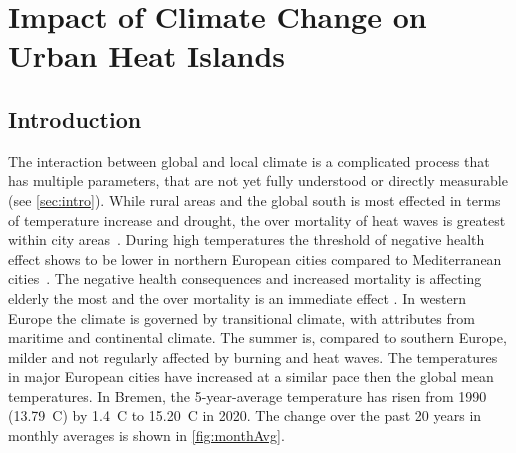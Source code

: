 \documentclass[12pt,a4paper, english,twoside]{scrartcl}
\begin{document}
  \newpage
  \section{Impact of Climate Change on Urban Heat Islands}\label{sec:UHITempImp}
    \subsection{Introduction}
      The interaction between global and local climate is a complicated process that has multiple parameters, that are not yet fully understood or directly measurable (see \cref{sec:intro}).  
      While rural areas and the global south is most effected in terms of temperature increase and drought, the over mortality of heat waves is greatest within city areas~\autocite{Gabriel2011}. During high temperatures the threshold of negative health effect shows to be lower in northern European cities compared to Mediterranean cities~\autocite{Baccini2008}. 
      The negative health consequences and increased mortality is affecting elderly the most and the over mortality is an immediate effect \autocite{Baccini2008}. 
      In western Europe the climate is governed by transitional climate, with attributes from maritime and continental climate.
      The summer is, compared to southern Europe, milder and not regularly affected by burning and heat waves. 
      The temperatures in major European cities have increased at a similar pace then the global mean temperatures. 
      In Bremen, the 5-year-average temperature has risen from 1990 (13.79\textdegree\ C)  by 1.4\textdegree\ C to 15.20\textdegree\ C in 2020.
      The change over the past 20 years in monthly averages is shown in \cref{fig:monthAvg}.
\end{document}
